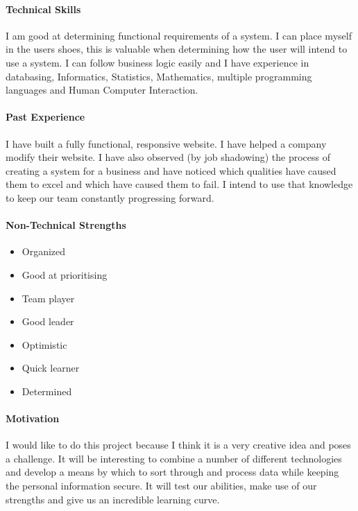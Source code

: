 \documentclass[english]{article}
\begin{document}
			\paragraph{Technical Skills}
			I am good at determining functional requirements of a system. I can place myself in the users shoes, this is valuable when determining how the user will intend to use a system. I can follow business logic easily and I have experience in databasing, Informatics, Statistics, Mathematics, multiple programming languages and Human Computer Interaction.
			
			\paragraph{Past Experience}
			I have built a fully functional, responsive website. I have helped a company modify their website. I have also observed (by job shadowing) the process of creating a system for a business and have noticed which qualities have caused them to excel and which have caused them to fail. I intend to use that knowledge to keep our team constantly progressing forward.
			
			\paragraph{Non-Technical Strengths}
			\begin{itemize}
				\setlength\itemsep{0.2em}
			        \item Organized
			        \item Good at prioritising 
			        \item Team player
			        \item Good leader
			        \item Optimistic
			        \item Quick learner
			        \item Determined
			\end{itemize}
			
			\paragraph{Motivation}
			I would like to do this project because I think it is a very creative idea and poses a challenge. It will be interesting to combine a number of different technologies and develop a means by which to sort through and process data while keeping the personal information secure. It will test our abilities, make use of our strengths and give us an incredible learning curve.
		
\end{document}
